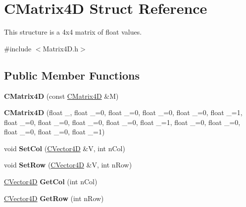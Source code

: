 \hypertarget{struct_c_matrix4_d}{}\section{C\+Matrix4D Struct Reference}
\label{struct_c_matrix4_d}


This structure is a 4x4 matrix of float values.  




{\ttfamily \#include $<$Matrix4\+D.\+h$>$}

\subsection*{Public Member Functions}
\begin{DoxyCompactItemize}
\item 
{\bfseries C\+Matrix4D} (const \hyperlink{struct_c_matrix4_d}{C\+Matrix4D} \&M)\hypertarget{struct_c_matrix4_d_a44bfdaf73313da7ada7eccffdc186186}{}\label{struct_c_matrix4_d_a44bfdaf73313da7ada7eccffdc186186}

\item 
{\bfseries C\+Matrix4D} (float \+\_, float \+\_=0, float \+\_=0, float \+\_=0, float \+\_=0, float \+\_=1, float \+\_=0, float \+\_=0, float \+\_=0, float \+\_=0, float \+\_=1, float \+\_=0, float \+\_=0, float \+\_=0, float \+\_=0, float \+\_=1)\hypertarget{struct_c_matrix4_d_a1b815cfad92b3df7201475c9d6858887}{}\label{struct_c_matrix4_d_a1b815cfad92b3df7201475c9d6858887}

\item 
void {\bfseries Set\+Col} (\hyperlink{struct_c_vector4_d}{C\+Vector4D} \&V, int n\+Col)\hypertarget{struct_c_matrix4_d_aa2c2522c59b52421f22d1d48beabb1ed}{}\label{struct_c_matrix4_d_aa2c2522c59b52421f22d1d48beabb1ed}

\item 
void {\bfseries Set\+Row} (\hyperlink{struct_c_vector4_d}{C\+Vector4D} \&V, int n\+Row)\hypertarget{struct_c_matrix4_d_a6f1fd92a2079a61de43afd8ea0746c39}{}\label{struct_c_matrix4_d_a6f1fd92a2079a61de43afd8ea0746c39}

\item 
\hyperlink{struct_c_vector4_d}{C\+Vector4D} {\bfseries Get\+Col} (int n\+Col)\hypertarget{struct_c_matrix4_d_a4861c5e053c169c9ffc299e15b6d1de3}{}\label{struct_c_matrix4_d_a4861c5e053c169c9ffc299e15b6d1de3}

\item 
\hyperlink{struct_c_vector4_d}{C\+Vector4D} {\bfseries Get\+Row} (int n\+Row)\hypertarget{struct_c_matrix4_d_ad3ad1b5fbf9bba47f7fac93ba854b4b5}{}\label{struct_c_matrix4_d_ad3ad1b5fbf9bba47f7fac93ba854b4b5}


\end{DoxyCompactItemize}
